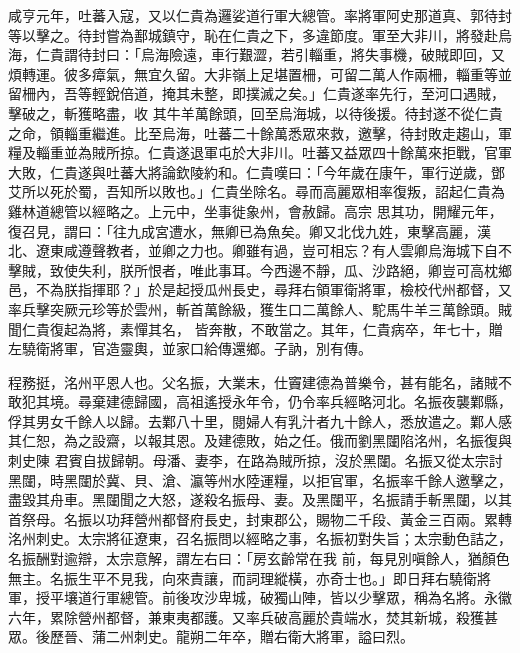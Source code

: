 \begin{pinyinscope}
 咸亨元年，吐蕃入寇，又以仁貴為邏娑道行軍大總管。率將軍阿史那道真、郭待封等以擊之。待封嘗為鄯城鎮守，恥在仁貴之下，多違節度。軍至大非川，將發赴烏海，仁貴謂待封曰：「烏海險遠，車行艱澀，若引輜重，將失事機，破賊即回，又煩轉運。彼多瘴氣，無宜久留。大非嶺上足堪置柵，可留二萬人作兩柵，輜重等並留柵內，吾等輕銳倍道，掩其未整，即撲滅之矣。」仁貴遂率先行，至河口遇賊，擊破之，斬獲略盡，收
 其牛羊萬餘頭，回至烏海城，以待後援。待封遂不從仁貴之命，領輜重繼進。比至烏海，吐蕃二十餘萬悉眾來救，邀擊，待封敗走趨山，軍糧及輜重並為賊所掠。仁貴遂退軍屯於大非川。吐蕃又益眾四十餘萬來拒戰，官軍大敗，仁貴遂與吐蕃大將論欽陵約和。仁貴嘆曰：「今年歲在康午，軍行逆歲，鄧艾所以死於蜀，吾知所以敗也。」仁貴坐除名。尋而高麗眾相率復叛，詔起仁貴為雞林道總管以經略之。上元中，坐事徙象州，會赦歸。高宗
 思其功，開耀元年，復召見，謂曰：「往九成宮遭水，無卿已為魚矣。卿又北伐九姓，東擊高麗，漢北、遼東咸遵聲教者，並卿之力也。卿雖有過，豈可相忘？有人雲卿烏海城下自不擊賊，致使失利，朕所恨者，唯此事耳。今西邊不靜，瓜、沙路絕，卿豈可高枕鄉邑，不為朕指揮耶？」於是起授瓜州長史，尋拜右領軍衛將軍，檢校代州都督，又率兵擊突厥元珍等於雲州，斬首萬餘級，獲生口二萬餘人、駝馬牛羊三萬餘頭。賊聞仁貴復起為將，素憚其名，
 皆奔散，不敢當之。其年，仁貴病卒，年七十，贈左驍衛將軍，官造靈輿，並家口給傳還鄉。子訥，別有傳。



 程務挺，洺州平恩人也。父名振，大業末，仕竇建德為普樂令，甚有能名，諸賊不敢犯其境。尋棄建德歸國，高祖遙授永年令，仍令率兵經略河北。名振夜襲鄴縣，俘其男女千餘人以歸。去鄴八十里，閱婦人有乳汁者九十餘人，悉放遣之。鄴人感其仁恕，為之設齋，以報其恩。及建德敗，始之任。俄而劉黑闥陷洺州，名振復與刺史陳
 君賓自拔歸朝。母潘、妻李，在路為賊所掠，沒於黑闥。名振又從太宗討黑闥，時黑闥於冀、貝、滄、瀛等州水陸運糧，以拒官軍，名振率千餘人邀擊之，盡毀其舟車。黑闥聞之大怒，遂殺名振母、妻。及黑闥平，名振請手斬黑闥，以其首祭母。名振以功拜營州都督府長史，封東郡公，賜物二千段、黃金三百兩。累轉洺州刺史。太宗將征遼東，召名振問以經略之事，名振初對失旨；太宗動色詰之，名振酬對逾辯，太宗意解，謂左右曰：「房玄齡常在我
 前，每見別嗔餘人，猶顏色無主。名振生平不見我，向來責讓，而詞理縱橫，亦奇士也。」即日拜右驍衛將軍，授平壤道行軍總管。前後攻沙卑城，破獨山陣，皆以少擊眾，稱為名將。永徽六年，累除營州都督，兼東夷都護。又率兵破高麗於貴端水，焚其新城，殺獲甚眾。後歷晉、蒲二州刺史。龍朔二年卒，贈右衛大將軍，謚曰烈。




\end{pinyinscope}
